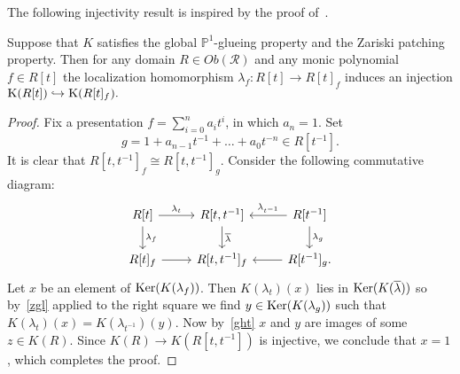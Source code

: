 \documentclass[oneside, 11pt]{amsart} \pdfoutput=1
\begin{document}
The following injectivity result is inspired by the proof of~\cite[Corollary~5.2]{Tu83}.
\begin{lemma} \label{lmp}
Suppose that $K$ satisfies the global $\mathbb{P}^1$-glueing property and the Zariski patching property. Then for any domain $R\in Ob(\mathcal{R})$ and any monic polynomial $f\in R[t]$ the localization homomorphism $\lambda_f\colon R[t]\rightarrow R[t]_f$ induces an injection ${\mathrm{K}}(R[t])\hookrightarrow{\mathrm{K}}(R[t]_f).$ \end{lemma}
\begin{proof}
	Fix a presentation $f=\sum_{i=0}^n a_it^i$, in which $a_n=1$. Set $$g=1+a_{n-1}t^{-1}+\ldots+a_0t^{-n}\in R[t^{-1}].$$ It is clear that $R[t, t^{-1}]_f \cong R[t, t^{-1}]_g$. Consider the following commutative diagram:
$$\begin{tikzcd}
	R[t] \ar{r}{\lambda_t} \ar{d}{\lambda_f} & R[t, t^{-1}] \ar{d}{\overline{\lambda}} & R[t^{-1}] \ar{l}[']{\lambda_{t^{-1}}} \ar{d}{\lambda_g}\\
	R[t]_f \ar{r} & R[t, t^{-1}]_f & R[t^{-1}]_g. \ar{l}
\end{tikzcd}$$
Let $x$ be an element of $\mathop{\mathrm{Ker}}\nolimits(K(\lambda_f))$. Then $K(\lambda_t)(x)$ lies in $\mathop{\mathrm{Ker}}\nolimits(K(\overline{\lambda}))$ so by~\cref{zgl} applied to the right square we find $y \in \mathop{\mathrm{Ker}}\nolimits(K(\lambda_{g}))$ such that $K(\lambda_t)(x) = K(\lambda_{t^{-1}})(y)$. Now by~\cref{ght} $x$ and $y$ are images of some $z \in K(R)$. Since $K(R) \to K(R[t, t^{-1}])$ is injective, we conclude that $x=1$, which completes the proof. \end{proof}
\end{document}
